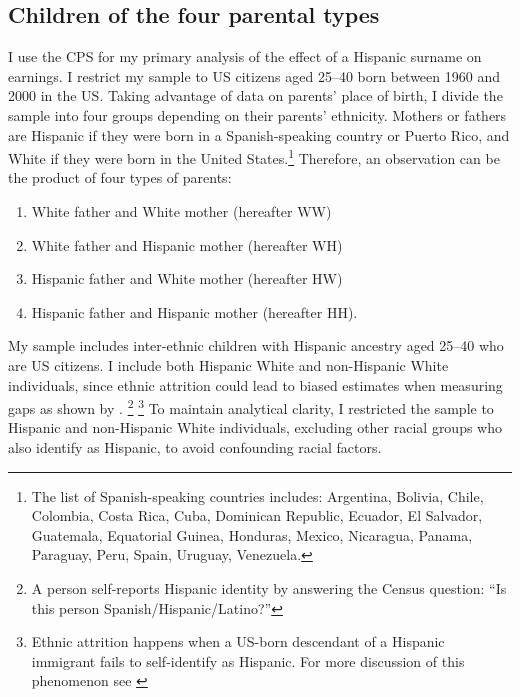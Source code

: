 \subsection{Children of the four parental types}

I use the CPS for my primary analysis of the effect of a Hispanic surname on earnings. I restrict my sample to US citizens  aged 25–40 born between 1960 and 2000 in the US. Taking advantage of data on parents’ place of birth, I divide the sample into four groups depending on their parents’ ethnicity. Mothers or fathers are Hispanic if they were born in a Spanish-speaking country or Puerto Rico, and White if they were born in the United States.\footnote{The list of Spanish-speaking countries includes: Argentina, Bolivia, Chile, Colombia, Costa Rica, Cuba, Dominican Republic, Ecuador, El Salvador, Guatemala, Equatorial Guinea, Honduras, Mexico, Nicaragua, Panama, Paraguay, Peru, Spain, Uruguay, Venezuela.} Therefore, an observation can be the product of four types of parents:
\begin{enumerate}
\item White father and White mother (hereafter WW) 
\item White father and Hispanic mother (hereafter WH)
\item Hispanic father and White mother (hereafter HW)
\item Hispanic father and Hispanic mother (hereafter HH).
\end{enumerate}

My sample includes inter-ethnic children with Hispanic ancestry aged 25–40 who are US citizens. I include both Hispanic White and non-Hispanic White individuals, since ethnic attrition could lead to biased estimates when measuring gaps as shown  by \textcite{hadah2024effect}. \footnote{A person self-reports Hispanic identity by answering the Census question: ``Is this person Spanish/Hispanic/Latino?''} \footnote{Ethnic attrition happens when a US-born descendant of a Hispanic immigrant fails to self-identify as Hispanic. For more discussion of this phenomenon see \textcite{antmanEthnicAttritionObserved2016,antmanEthnicAttritionAssimilation2020}} To maintain analytical clarity, I restricted the sample to Hispanic and non-Hispanic White individuals, excluding other racial groups who also identify as Hispanic, to avoid confounding racial factors.

